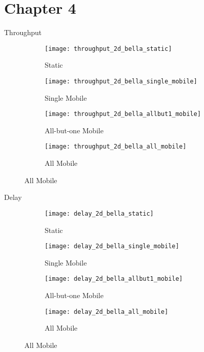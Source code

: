\documentclass[aspectratio=43]{beamer}
\begin{document}
\section{Chapter 4}
\begin{frame}{Throughput}
	\begin{figure}[h]
		\begin{subfigure}[t]{0.3\textwidth}
			\centering
			\texttt{[image: throughput\_2d\_bella\_static]}
			\caption{Static}
			\label{fig:throughput_2d_bella_static}
		\end{subfigure}
		\begin{subfigure}[t]{0.3\textwidth}
			\centering
			\texttt{[image: throughput\_2d\_bella\_single\_mobile]}
			\caption{Single Mobile}
			\label{fig:throughput_2d_bella_single_mobile}
		\end{subfigure}
		
		\begin{subfigure}[t]{0.3\textwidth}
			\centering
			\texttt{[image: throughput\_2d\_bella\_allbut1\_mobile]}
			\caption{All-but-one Mobile}
			\label{fig:throughput_2d_bella_allbut1_mobile}
		\end{subfigure}
		\begin{subfigure}[t]{0.3\textwidth}
			\centering
			\texttt{[image: throughput\_2d\_bella\_all\_mobile]}
			\caption{All Mobile}
			\label{fig:throughput_2d_bella_all_mobile}
		\end{subfigure}
		\label{fig:2d_throughput}
	\end{figure}
\end{frame}

\begin{frame}{Delay}
	\begin{figure}[h]
		\begin{subfigure}[t]{0.3\textwidth}
			\centering
			\texttt{[image: delay\_2d\_bella\_static]}
			\caption{Static}
			\label{fig:delay_2d_bella_static}
		\end{subfigure}
		\begin{subfigure}[t]{0.3\textwidth}
			\centering
			\texttt{[image: delay\_2d\_bella\_single\_mobile]}
			\caption{Single Mobile}
			\label{fig:delay_2d_bella_single_mobile}
		\end{subfigure}
		
		\begin{subfigure}[t]{0.3\textwidth}
			\centering
			\texttt{[image: delay\_2d\_bella\_allbut1\_mobile]}
			\caption{All-but-one Mobile}
			\label{fig:delay_2d_bella_allbut1_mobile}
		\end{subfigure}
		\begin{subfigure}[t]{0.3\textwidth}
			\centering
			\texttt{[image: delay\_2d\_bella\_all\_mobile]}
			\caption{All Mobile}
			\label{fig:delay_2d_bella_all_mobile}
		\end{subfigure}
		\label{fig:2d_delay}
	\end{figure}
\end{frame}
\end{document}
